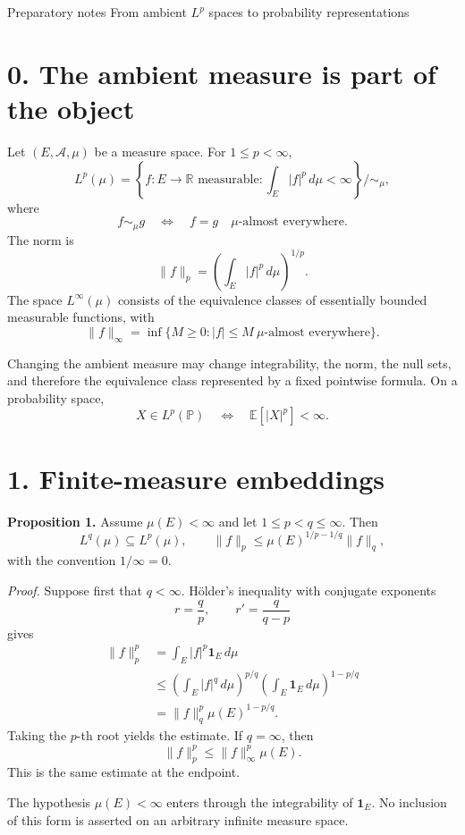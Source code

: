 \sheettitle
  {Preparatory notes}
  {From ambient $L^p$ spaces to probability representations}

\section*{0. The ambient measure is part of the object}

Let $(E,\mathcal A,\mu)$ be a measure space. For $1\le p<\infty$,
\[
L^p(\mu)
=
\left\{
f:E\to\mathbb R\text{ measurable}:
\int_E|f|^p\,d\mu<\infty
\right\}\big/\!\sim_\mu,
\]
where
\[
f\sim_\mu g
\quad\Longleftrightarrow\quad
f=g\quad\mu\text{-almost everywhere}.
\]
The norm is
\[
\|f\|_p
=
\left(\int_E|f|^p\,d\mu\right)^{1/p}.
\]
The space $L^\infty(\mu)$ consists of the equivalence classes of essentially bounded measurable functions, with
\[
\|f\|_\infty
=
\inf\{M\ge0:|f|\le M\ \mu\text{-almost everywhere}\}.
\]

Changing the ambient measure may change integrability, the norm, the null sets, and therefore the equivalence class represented by a fixed pointwise formula. On a probability space,
\[
X\in L^p(\mathbb P)
\quad\Longleftrightarrow\quad
\mathbb E[|X|^p]<\infty.
\]

\section*{1. Finite-measure embeddings}

\textbf{Proposition 1.}
Assume $\mu(E)<\infty$ and let $1\le p<q\le\infty$. Then
\[
L^q(\mu)\subseteq L^p(\mu),
\qquad
\|f\|_p
\le
\mu(E)^{1/p-1/q}\|f\|_q,
\]
with the convention $1/\infty=0$.

\textit{Proof.}
Suppose first that $q<\infty$. Hölder's inequality with conjugate exponents
\[
r=\frac qp,
\qquad
r'=\frac q{q-p}
\]
gives
\[
\begin{aligned}
\|f\|_p^p
&=
\int_E |f|^p\mathbf 1_E\,d\mu\\
&\le
\left(\int_E|f|^q\,d\mu\right)^{p/q}
\left(\int_E\mathbf 1_E\,d\mu\right)^{1-p/q}\\
&=
\|f\|_q^p\mu(E)^{1-p/q}.
\end{aligned}
\]
Taking the $p$-th root yields the estimate. If $q=\infty$, then
\[
\|f\|_p^p
\le
\|f\|_\infty^p\mu(E).
\]
This is the same estimate at the endpoint.

The hypothesis $\mu(E)<\infty$ enters through the integrability of $\mathbf 1_E$. No inclusion of this form is asserted on an arbitrary infinite measure space.

